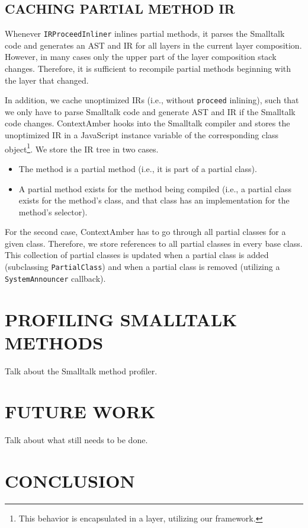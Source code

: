 \documentclass[english,paper=a4,twocolumn=true,DIV=calc,fontsize=9pt]{scrartcl}
\begin{document}
\subsection{CACHING PARTIAL METHOD IR}
Whenever \texttt{IRProceedInliner} inlines partial methods, it parses the Smalltalk code and generates an AST and IR for all layers in the current layer composition. However, in many cases only the upper part of the layer composition stack changes. Therefore, it is sufficient to recompile partial methods beginning with the layer that changed.

In addition, we cache unoptimized IRs (i.e., without \texttt{proceed} inlining), such that we only have to parse Smalltalk code and generate AST and IR if the Smalltalk code changes. ContextAmber hooks into the Smalltalk compiler and stores the unoptimized IR in a JavaScript instance variable of the corresponding class object\footnote{This behavior is encapsulated in a layer, utilizing our framework.}. We store the IR tree in two cases.

\begin{itemize}
    \item The method is a partial method (i.e., it is part of a partial class).
    \item A partial method exists for the method being compiled (i.e., a partial class exists for the method's class, and that class has an implementation for the method's selector).
\end{itemize}

For the second case, ContextAmber has to go through all partial classes for a given class. Therefore, we store references to all partial classes in every base class. This collection of partial classes is updated when a partial class is added (subclassing \texttt{PartialClass}) and when a partial class is removed (utilizing a \texttt{SystemAnnouncer} callback).

\section{PROFILING SMALLTALK METHODS}
Talk about the Smalltalk method profiler.

\section{FUTURE WORK}
Talk about what still needs to be done.

\section{CONCLUSION}

{}

\end{document}
